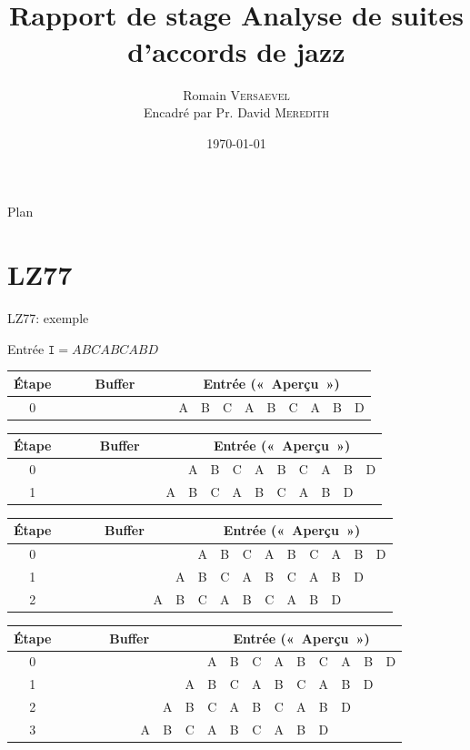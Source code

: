 \documentclass[10pt]{beamer}
\title[Analyse de suites d'accords de jazz]{\large \\ Rapport de stage \Large Analyse de suites d'accords de jazz}
\institute{ENS de Lyon, M1 Informatique fondamentale}
\author[R. Versaevel]{\normalsize Romain \textsc{Versaevel}\newline \\ \normalsize Encadré par Pr. David \textsc{Meredith}}
\date{\today}
\newcommand{\guill}[1]{«~#1~»}
\begin{document}
\begin{frame}
\titlepage
\end{frame}

\begin{frame}{Plan}
\tableofcontents
\end{frame}

\section{LZ77}

\begin{frame}{LZ77: exemple}
\begin{block}{Entrée}
$\texttt{I}=ABCABCABD$
\end{block}

\bigskip

 {
\begin{tabular}{|c|c|c|c|c|c|c|c|c|c|c|c|c|c|c|c|c|c|c|}
\hline
\textbf{Étape}&\multicolumn{9}{|c|}{\textbf{Buffer}} & \multicolumn{9}{|c|}{\textbf{Entrée} (\guill{Aperçu})} \\
\hline
0&&&&&&&&&&A&B&C&A&B&C&A&B&D\\
\hline
\end{tabular}}

 {
\begin{tabular}{|c|c|c|c|c|c|c|c|c|c|c|c|c|c|c|c|c|c|c|}
\hline
\textbf{Étape}&\multicolumn{9}{|c|}{\textbf{Buffer}} & \multicolumn{9}{|c|}{\textbf{Entrée} (\guill{Aperçu})} \\
\hline
0&&&&&&&&&&A&B&C&A&B&C&A&B&D\\
\hline
1&&&&&&&&&A&B&C&A&B&C&A&B&D&\\
\hline
\end{tabular}}

 {
\begin{tabular}{|c|c|c|c|c|c|c|c|c|c|c|c|c|c|c|c|c|c|c|}
\hline
\textbf{Étape}&\multicolumn{9}{|c|}{\textbf{Buffer}} & \multicolumn{9}{|c|}{\textbf{Entrée} (\guill{Aperçu})} \\
\hline
0&&&&&&&&&&A&B&C&A&B&C&A&B&D\\
\hline
1&&&&&&&&&A&B&C&A&B&C&A&B&D&\\
\hline
2&&&&&&&&A&B&C&A&B&C&A&B&D&&\\
\hline
\end{tabular}}

 {
\begin{tabular}{|c|c|c|c|c|c|c|c|c|c|c|c|c|c|c|c|c|c|c|}
\hline
\textbf{Étape}&\multicolumn{9}{|c|}{\textbf{Buffer}} & \multicolumn{9}{|c|}{\textbf{Entrée} (\guill{Aperçu})} \\
\hline
0&&&&&&&&&&A&B&C&A&B&C&A&B&D\\
\hline
1&&&&&&&&&A&B&C&A&B&C&A&B&D&\\
\hline
2&&&&&&&&A&B&C&A&B&C&A&B&D&&\\
\hline
3&&&&&&&A&B&C&A&B&C&A&B&D&&&\\
\hline
\end{tabular}}


\end{frame}
\end{document}
